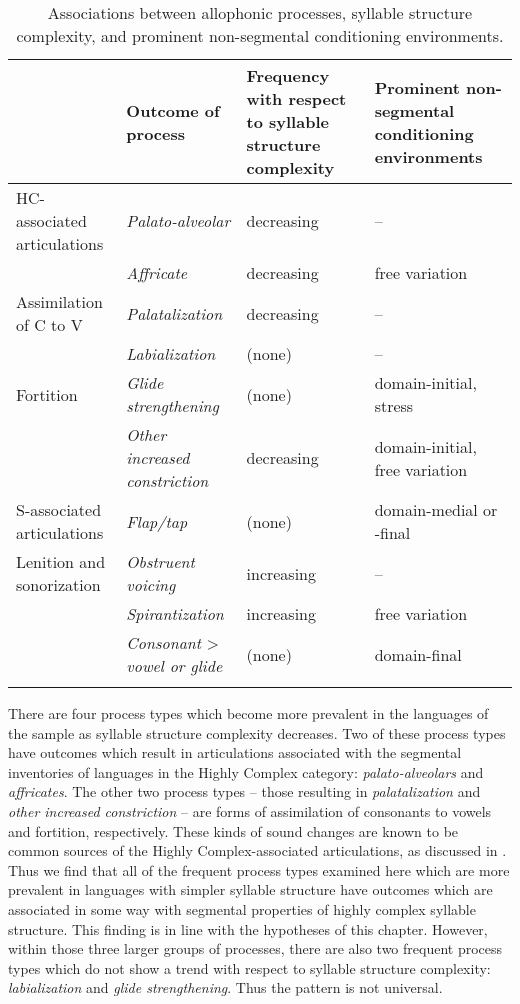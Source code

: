 \begin{sidewaystable}
\begin{tabularx}{\textwidth}{lIQI}
\lsptoprule
 & Outcome of process &\hangindent=0pt Frequency with respect to syllable structure complexity &\hangindent=0pt Prominent non-segmental conditioning environments\\\midrule
HC-associated articulations & \textit{Palato-alveolar} & decreasing & --\\
 & \textit{Affricate} & decreasing & free variation\\\tablevspace
Assimilation of C to V & \textit{Palatalization} & decreasing & --\\
 & \textit{Labialization} & (none) & --\\\tablevspace
Fortition & \textit{Glide strengthening} & (none) & domain-initial, stress\\
& \textit{Other increased constriction} & decreasing & domain-initial, free variation\\\tablevspace
S-associated articulations & \textit{Flap/tap} & (none) & domain-medial or -final\\\tablevspace
Lenition and sonorization & \textit{Obstruent voicing} & increasing & --\\
& \textit{Spirantization} & increasing & free variation\\
& \textit{Consonant} > \textit{vowel or glide} & (none) & domain-final\\
\lspbottomrule
\end{tabularx}
\caption{\label{tab:7.7}Associations between allophonic processes, syllable structure complexity, and prominent non-segmental conditioning environments.}
\end{sidewaystable}

  There are four process types which become more prevalent in the languages of the sample as syllable structure complexity decreases. Two of these process types have outcomes which result in articulations associated with the segmental inventories of languages in the Highly Complex category: \textit{palato-alveolars} and \textit{affricates}. The other two process types -- those resulting in \textit{palatalization} and \textit{other increased constriction} -- are forms of assimilation of consonants to vowels and fortition, respectively. These kinds of sound changes are known to be common sources of the Highly Complex-associated articulations, as discussed in . Thus we find that all of the frequent process types examined here which are more prevalent in languages with simpler syllable structure have outcomes which are associated in some way with segmental properties of highly complex syllable structure. This finding is in line with the hypotheses of this chapter. However, within those three larger groups of processes, there are also two frequent process types which do not show a trend with respect to syllable structure complexity: \textit{labialization} and \textit{glide strengthening}. Thus the pattern is not universal.

